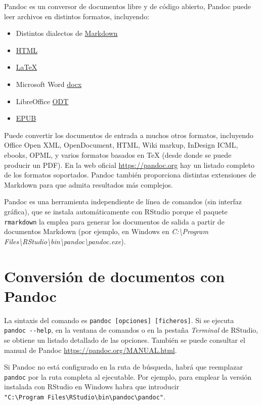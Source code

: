 \documentclass[
]{book}
\theoremstyle{break}
\theoremstyle{nonumberplain}
\begin{document}
Pandoc es un conversor de documentos libre y de código abierto,
Pandoc puede leer archivos en distintos formatos, incluyendo:

\begin{itemize}
\item
  Distintos dialectos de \href{http://daringfireball.net/projects/markdown/}{Markdown}
\item
  \href{http://www.w3.org/TR/html40/}{HTML}
\item
  \href{http://www.latex-project.org/}{LaTeX}
\item
  Microsoft Word \href{https://en.wikipedia.org/wiki/Office_Open_XML}{docx}
\item
  LibreOffice \href{http://en.wikipedia.org/wiki/OpenDocument}{ODT}
\item
  \href{http://en.wikipedia.org/wiki/EPUB}{EPUB}
\end{itemize}

Puede convertir los documentos de entrada a muchos otros formatos, incluyendo Office Open XML, OpenDocument, HTML, Wiki markup, InDesign ICML, ebooks, OPML, y varios formatos basados en TeX (desde donde se puede producir un PDF).
En la web oficial \url{https://pandoc.org} hay un listado completo de los formatos soportados.
Pandoc también proporciona distintas extensiones de Markdown para que admita resultados más complejos.

Pandoc es una herramienta independiente de línea de comandos (sin interfaz gráfica), que se instala automáticamente con RStudio porque el paquete \texttt{rmarkdown} la emplea para generar los documentos de salida a partir de documentos Markdown
(por ejemplo, en Windows en \emph{C:\textbackslash Program Files\textbackslash RStudio\textbackslash bin\textbackslash pandoc\textbackslash pandoc.exe}).

\hypertarget{conversion}{%
\section{Conversión de documentos con Pandoc}\label{conversion}}

La sintaxis del comando es \texttt{pandoc\ {[}opciones{]}\ {[}ficheros{]}}. Si se ejecuta \texttt{pandoc\ -\/-help},
en la ventana de comandos o en la pestaña \emph{Terminal} de RStudio, se obtiene un listado detallado de las opciones.
También se puede consultar el manual de Pandoc \url{https://pandoc.org/MANUAL.html}.

Si Pandoc no está configurado en la ruta de búsqueda, habrá que reemplazar \texttt{pandoc} por la ruta completa al ejecutable.
Por ejemplo, para emplear la versión instalada con RStudio en Windows habra que introducir \texttt{"C:\textbackslash{}Program\ Files\textbackslash{}RStudio\textbackslash{}bin\textbackslash{}pandoc\textbackslash{}pandoc"}.
\end{document}
